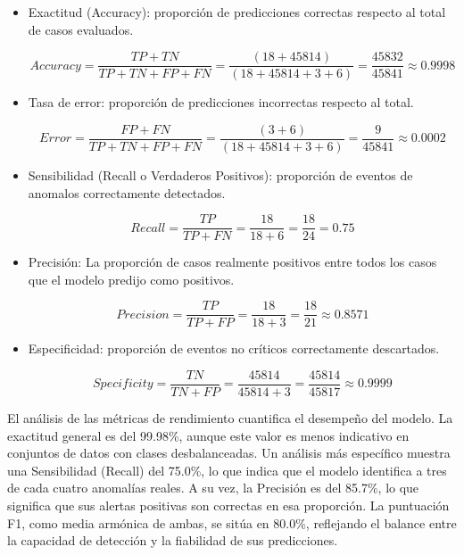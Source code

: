 \begin{itemize}
  \item  Exactitud (Accuracy): proporción de predicciones correctas respecto al total de casos evaluados.

        $$Accuracy = \frac{TP+TN}{TP+TN+FP+FN}=\frac{(18+45814)}{(18+45814+3+6)}=\frac{45832}{45841}\approx 0.9998$$

  \item Tasa de error: proporción de predicciones incorrectas respecto al total.

        $$Error = \frac{FP+FN}{TP+TN+FP+FN}=\frac{(3+6)}{(18+45814+3+6)}=\frac{9}{45841}\approx 0.0002$$

  \item Sensibilidad (Recall o Verdaderos Positivos): proporción de eventos de anomalos correctamente detectados.

        $$Recall = \frac{TP}{TP+FN}=\frac{18}{18+6}=\frac{18}{24}=0.75$$

  \item Precisión: La proporción de casos realmente positivos entre todos los casos que el modelo predijo como positivos.

        $$Precision = \frac{TP}{TP+FP}=\frac{18}{18+3}=\frac{18}{21}\approx 0.8571$$

  \item Especificidad: proporción de eventos no críticos correctamente descartados.

        $$Specificity = \frac{TN}{TN+FP}=\frac{45814}{45814+3}=\frac{45814}{45817}\approx 0.9999$$
\end{itemize}

El análisis de las métricas de rendimiento cuantifica el desempeño del modelo. La exactitud general es del 99.98\%, aunque este valor es menos indicativo en conjuntos de datos con clases desbalanceadas. Un análisis más específico muestra una Sensibilidad (Recall) del 75.0\%, lo que indica que el modelo identifica a tres de cada cuatro anomalías reales. A su vez, la Precisión es del 85.7\%, lo que significa que sus alertas positivas son correctas en esa proporción. La puntuación F1, como media armónica de ambas, se sitúa en 80.0\%, reflejando el balance entre la capacidad de detección y la fiabilidad de sus predicciones.

